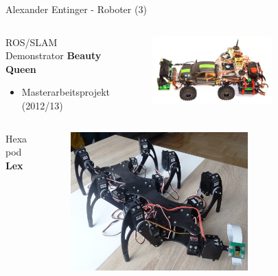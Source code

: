 \documentclass{beamer}
\begin{document}
\begin{frame}{Alexander Entinger - Roboter (3)}
	\begin{columns}
		\begin{column}{0.5\textwidth}
			\begin{large}ROS/SLAM Demonstrator \textbf{Beauty Queen}\end{large}
			\begin{itemize}
				\item Masterarbeitsprojekt (2012/13)
			\end{itemize}
		\end{column}
		\begin{column}{0.5\textwidth}
			\begin{figure}[H]
				\centering
				\includegraphics[width=0.7\textwidth]{./images/robot-beauty-queen.jpg}
				\label{fig:robot-beauty-queen}
			\end{figure}
		\end{column}
	\end{columns}
	
	\begin{columns}
		\begin{column}{0.5\textwidth}
			\begin{large}Hexapod \textbf{Lex}\end{large}
		\end{column}
		\begin{column}{0.5\textwidth}
			\begin{figure}[H]
				\centering
				\includegraphics[width=0.7\textwidth]{./images/robot-lex.jpg}
				\label{fig:robot-lex}
			\end{figure}
		\end{column}
	\end{columns}
\end{frame}
\end{document}
